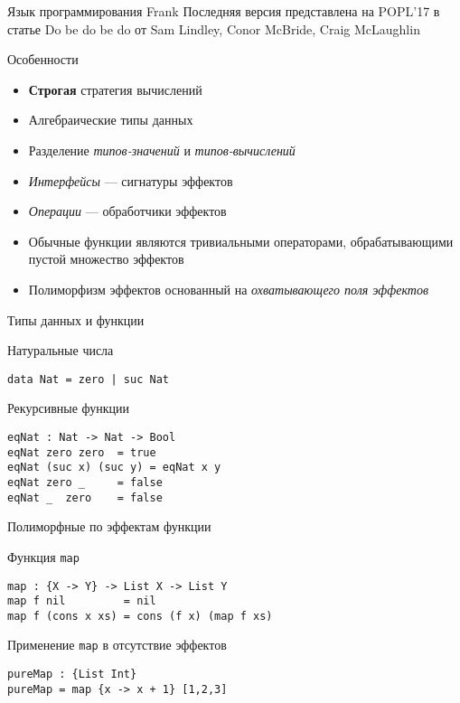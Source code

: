 \begin{frame}{Язык программирования Frank}
  Последняя версия представлена на POPL'17 в статье Do be do be do от Sam Lindley, Conor McBride, Craig McLaughlin
  \begin{block}{Особенности}
    \begin{itemize}
      \item \textbf{Строгая} стратегия вычислений
      \item Алгебраические типы данных
      \item Разделение \emph{типов-значений} и \emph{типов-вычислений}
      \item \emph{Интерфейсы} --- сигнатуры эффектов
      \item \emph{Операции} --- обработчики эффектов
      \item Обычные функции являются тривиальными операторами, обрабатывающими пустой множество эффектов
      \item Полиморфизм эффектов основанный на \emph{охватывающего поля эффектов}
    \end{itemize}
  \end{block}
\end{frame}

\begin{frame}[fragile]{Типы данных и функции}
\begin{block}{Натуральные числа}
\begin{verbatim}
data Nat = zero | suc Nat
\end{verbatim}
\end{block}
\pause
\begin{block}{Рекурсивные функции}
\begin{verbatim}
eqNat : Nat -> Nat -> Bool
eqNat zero zero  = true
eqNat (suc x) (suc y) = eqNat x y
eqNat zero _     = false
eqNat _  zero    = false
\end{verbatim}
\end{block}
\end{frame}

\begin{frame}[fragile]{Полиморфные по эффектам функции}
\begin{block}{Функция \texttt{map}}
\begin{verbatim}
map : {X -> Y} -> List X -> List Y
map f nil         = nil
map f (cons x xs) = cons (f x) (map f xs)
\end{verbatim}
\end{block}
\pause
\begin{block}{Применение \texttt{map} в отсутствие эффектов}
\begin{verbatim}
pureMap : {List Int}
pureMap = map {x -> x + 1} [1,2,3]
\end{verbatim}
\end{block}
\end{frame}


